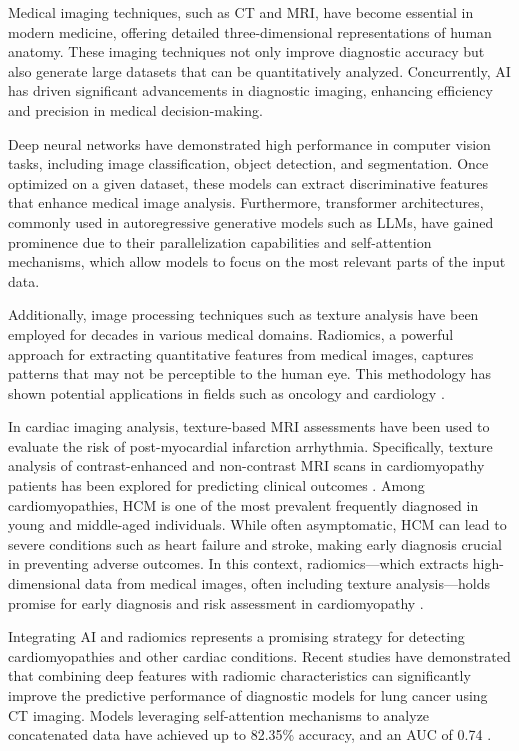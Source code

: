 \documentclass[journal,twoside,web]{ieeecolor}
\begin{document}
Medical imaging techniques, such as \gls{CT} and \gls{MRI}, have become essential in modern medicine, offering detailed three-dimensional representations of human anatomy. These imaging techniques not only improve diagnostic accuracy but also generate large datasets that can be quantitatively analyzed. Concurrently, \gls{AI} has driven significant advancements in diagnostic imaging, enhancing efficiency and precision in medical decision-making.

Deep neural networks have demonstrated high performance in computer vision tasks, including image classification, object detection, and segmentation. Once optimized on a given dataset, these models can extract discriminative features that enhance medical image analysis. Furthermore, transformer architectures, commonly used in autoregressive generative models such as \gls{LLMs}, have gained prominence due to their parallelization capabilities and self-attention mechanisms, which allow models to focus on the most relevant parts of the input data.

Additionally, image processing techniques such as texture analysis have been employed for decades in various medical domains. Radiomics, a powerful approach for extracting quantitative features from medical images, captures patterns that may not be perceptible to the human eye. This methodology has shown potential applications in fields such as oncology and cardiology \cite{mayerhoeferIntroductionRadiomics2020}.

In cardiac imaging analysis, texture-based MRI assessments have been used to evaluate the risk of post-myocardial infarction arrhythmia. Specifically, texture analysis of contrast-enhanced and non-contrast MRI scans in cardiomyopathy patients has been explored for predicting clinical outcomes \cite{schofieldTextureAnalysisCardiovascular2019a}. Among cardiomyopathies, \gls{HCM} is one of the most prevalent frequently diagnosed in young and middle-aged individuals. While often asymptomatic, \gls{HCM} can lead to severe conditions such as heart failure and stroke, making early diagnosis crucial in preventing adverse outcomes. In this context, radiomics—which extracts high-dimensional data from medical images, often including texture analysis—holds promise for early diagnosis and risk assessment in cardiomyopathy \cite{kwonComparisonMortalityCause2022}.

Integrating AI and radiomics represents a promising strategy for detecting cardiomyopathies and other cardiac conditions. Recent studies have demonstrated that combining deep features with radiomic characteristics can significantly improve the predictive performance of diagnostic models for lung cancer using CT imaging. Models leveraging self-attention mechanisms to analyze concatenated data have achieved up to 82.35\% accuracy, and an AUC of 0.74 \cite{lambinRadiomicsExtractingMore2012}.
\end{document}
